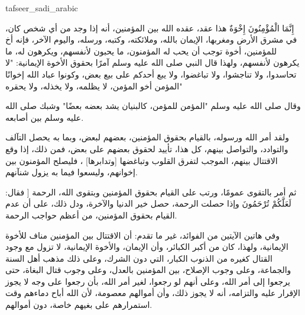 \begin{taggedblock}{tafseer_sadi_arabic}
\begin{Arabic}
{ إِنَّمَا الْمُؤْمِنُونَ إِخْوَةٌ }
هذا عقد، عقده الله بين المؤمنين، أنه إذا وجد من أي شخص كان، في مشرق الأرض ومغربها، الإيمان بالله، وملائكته، وكتبه، ورسله، واليوم الآخر، فإنه أخ للمؤمنين، أخوة توجب أن يحب له المؤمنون، ما يحبون لأنفسهم، ويكرهون له، ما يكرهون لأنفسهم، ولهذا قال النبي صلى الله عليه وسلم آمرًا بحقوق الأخوة الإيمانية:
"لا تحاسدوا، ولا تناجشوا، ولا تباغضوا، ولا يبع أحدكم على بيع بعض، وكونوا عباد الله إخوانًا المؤمن أخو المؤمن، لا يظلمه، ولا يخذله، ولا يحقره"

وقال صلى الله عليه وسلم
"المؤمن للمؤمن، كالبنيان يشد بعضه بعضًا"
وشبك صلى الله عليه وسلم بين أصابعه.

ولقد أمر الله ورسوله، بالقيام بحقوق المؤمنين، بعضهم لبعض، وبما به يحصل التآلف والتوادد، والتواصل بينهم، كل هذا، تأييد لحقوق بعضهم على بعض، فمن ذلك، إذا وقع الاقتتال بينهم، الموجب لتفرق القلوب وتباغضها
[وتدابرها]
، فليصلح المؤمنون بين إخوانهم، وليسعوا فيما به يزول شنآنهم.

ثم أمر بالتقوى عمومًا، ورتب على القيام بحقوق المؤمنين وبتقوى الله، الرحمة [ فقال:
{ لَعَلَّكُمْ تُرْحَمُونَ }
وإذا حصلت الرحمة، حصل خير الدنيا والآخرة، ودل ذلك، على أن عدم القيام بحقوق المؤمنين، من أعظم حواجب الرحمة.

وفي هاتين الآيتين من الفوائد، غير ما تقدم: أن الاقتتال بين المؤمنين مناف للأخوة الإيمانية، ولهذا، كان من أكبر الكبائر، وأن الإيمان، والأخوة الإيمانية، لا تزول مع وجود القتال كغيره من الذنوب الكبار، التي دون الشرك، وعلى ذلك مذهب أهل السنة والجماعة، وعلى وجوب الإصلاح، بين المؤمنين بالعدل، وعلى وجوب قتال البغاة، حتى يرجعوا إلى أمر الله، وعلى أنهم لو رجعوا، لغير أمر الله، بأن رجعوا على وجه لا يجوز الإقرار عليه والتزامه، أنه لا يجوز ذلك، وأن أموالهم معصومة، لأن الله أباح دماءهم وقت استمرارهم على بغيهم خاصة، دون أموالهم.
\end{Arabic}
\end{taggedblock}
